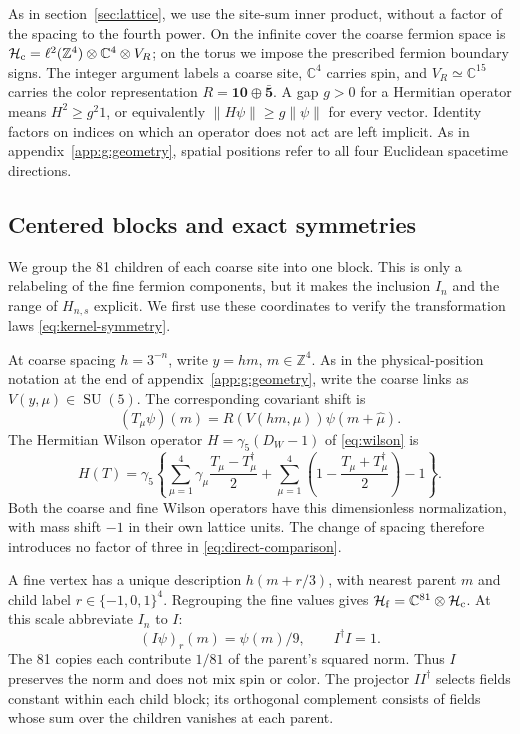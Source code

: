 \documentclass[11pt,a4paper]{article}
\theoremstyle{remark}
\DeclareMathOperator{\SU}{SU}
\begin{document}
As in section~\ref{sec:lattice}, we use the site-sum inner product,
without a factor of the spacing to the fourth power. On the infinite
cover the coarse fermion space is
$\mathcal H_{\rm c}=\ell^2(\mathbb Z^4)\otimes\mathbb C^4\otimes V_R$;
on the torus we impose the prescribed fermion boundary signs.
The integer argument labels a coarse site, $\mathbb C^4$ carries spin,
and $V_R\simeq\mathbb C^{15}$ carries the color representation
$R=\mathbf{10}\oplus\bar{\mathbf5}$. A gap $g>0$ for a Hermitian
operator means $H^2\ge g^2 1$, or equivalently
$\|H\psi\|\ge g\|\psi\|$ for every vector. Identity factors on
indices on which an operator does not act are left implicit. As in
appendix~\ref{app:g:geometry}, spatial positions refer to all four
Euclidean spacetime directions.

\subsection{Centered blocks and exact symmetries}

We group the 81 children of each coarse site into one block. This is
only a relabeling of the fine fermion components, but it makes the
inclusion $I_n$ and the range of $H_{n,s}$ explicit. We first use
these coordinates to verify the transformation laws
\eqref{eq:kernel-symmetry}.

At coarse spacing $h=3^{-n}$, write $y=hm$,
$m\in\mathbb Z^4$. As in the
physical-position notation at the end of appendix~\ref{app:g:geometry},
write the coarse links as $V(y,\mu)\in\SU(5)$. The corresponding
covariant shift is
\begin{equation}
 (T_\mu\psi)(m)=R(V(hm,\mu))\psi(m+\hat\mu).
\end{equation}
The Hermitian Wilson operator $H=\gamma_5(D_W-1)$ of
\eqref{eq:wilson} is
\begin{equation}
 H(T)=\gamma_5\left\{
 \sum_{\mu=1}^4\gamma_\mu\frac{T_\mu-T_\mu^{\dagger}}{2}
 +\sum_{\mu=1}^4\left(1-\frac{T_\mu+T_\mu^{\dagger}}{2}\right)-1
 \right\}.
 \label{app:s:wilson}
\end{equation}
Both the coarse and fine Wilson operators have this dimensionless
normalization, with mass shift $-1$ in their own lattice units.
The change of spacing therefore introduces no factor of three in
\eqref{eq:direct-comparison}.

A fine vertex has a unique description $h(m+r/3)$, with nearest
parent $m$ and child label $r\in\{-1,0,1\}^4$. Regrouping the
fine values gives $\mathcal H_{\rm f}=\mathbb C^{81}\otimes
\mathcal H_{\rm c}$. At this scale abbreviate $I_n$ to $I$:
\begin{equation}
 (I\psi)_r(m)=\psi(m)/9,\qquad I^{\dagger} I=1.
\end{equation}
The 81 copies each contribute $1/81$ of the parent's squared norm.
Thus $I$ preserves the norm and does not mix spin or color.
The projector $II^\dagger$ selects fields constant within each child
block; its orthogonal complement consists of fields whose sum over the
children vanishes at each parent.
\end{document}

